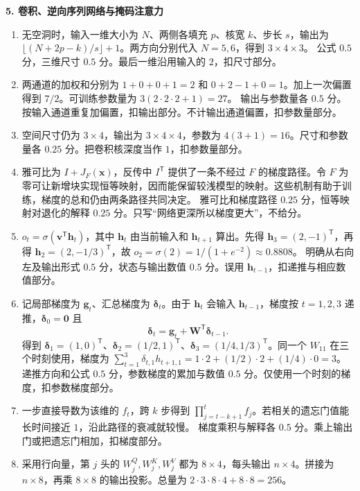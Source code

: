 \noindent\textbf{5. 卷积、逆向序列网络与掩码注意力}

\begin{enumerate}[label=(\arabic*)]
\item 无空洞时，输入一维大小为 $N$、两侧各填充 $p$、核宽 $k$、步长 $s$，输出为 $\lfloor(N+2p-k)/s\rfloor+1$。两方向分别代入 $N=5,6$，得到 $3\times4\times3$。
公式 $0.5$ 分，三维尺寸 $0.5$ 分。最后一维沿用输入的 $2$，扣尺寸部分。
\item 两通道的加权和分别为 $1+0+0+1=2$ 和 $0+2-1+0=1$。加上一次偏置得到 $7/2$。可训练参数量为 $3(2\cdot2\cdot2+1)=27$。
输出与参数量各 $0.5$ 分。按输入通道重复加偏置，扣输出部分。不计输出通道偏置，扣参数量部分。
\item 空间尺寸仍为 $3\times4$，输出为 $3\times4\times4$，参数为 $4(3+1)=16$。尺寸和参数量各 $0.25$ 分。把卷积核深度当作 $1$，扣参数量部分。
\item 雅可比为 $I+J_F(\bm{x})$，反传中 $I^{\mathsf T}$ 提供了一条不经过 $F$ 的梯度路径。令 $F$ 为零可让新增块实现恒等映射，因而能保留较浅模型的映射。这些机制有助于训练，梯度的总和仍由两条路径共同决定。
雅可比和梯度路径 $0.25$ 分，恒等映射对退化的解释 $0.25$ 分。只写“网络更深所以梯度更大”，不给分。
\item $o_t=\sigma(\bm{v}^{\mathsf T}\bm{h}_t)$，其中 $\bm{h}_t$ 由当前输入和 $\bm{h}_{t+1}$ 算出。先得 $\bm{h}_3=(2,-1)^{\mathsf T}$，再得 $\bm{h}_2=(2,-1/3)^{\mathsf T}$，故 $o_2=\sigma(2)=1/(1+e^{-2})\approx0.8808$。
明确从右向左及输出形式 $0.5$ 分，状态与输出数值 $0.5$ 分。误用 $\bm{h}_{t-1}$，扣递推与相应数值部分。
\item 记局部梯度为 $\bm{g}_t$、汇总梯度为 $\bm{\delta}_t$。由于 $\bm{h}_t$ 会输入 $\bm{h}_{t-1}$，梯度按 $t=1,2,3$ 递推，$\bm{\delta}_0=\bm{0}$ 且
\[
\bm{\delta}_t=\bm{g}_t+\bm{W}^{\mathsf T}\bm{\delta}_{t-1}.
\]
得到 $\bm{\delta}_1=(1,0)^{\mathsf T}$、$\bm{\delta}_2=(1/2,1)^{\mathsf T}$、$\bm{\delta}_3=(1/4,1/3)^{\mathsf T}$。同一个 $W_{11}$ 在三个时刻使用，梯度为 $\sum_{t=1}^3\delta_{t,1}h_{t+1,1}=1\cdot2+(1/2)\cdot2+(1/4)\cdot0=3$。
递推方向和公式 $0.5$ 分，参数梯度的累加与数值 $0.5$ 分。仅使用一个时刻的梯度，扣参数梯度部分。
\item 一步直接导数为该维的 $f_t$，跨 $k$ 步得到 $\prod_{j=t-k+1}^t f_j$。若相关的遗忘门值能长时间接近 $1$，沿此路径的衰减就较慢。
梯度乘积与解释各 $0.5$ 分。乘上输出门或把遗忘门相加，扣梯度部分。
\item 采用行向量，第 $j$ 头的 $W_j^Q,W_j^K,W_j^V$ 都为 $8\times4$，每头输出 $n\times4$。拼接为 $n\times8$，再乘 $8\times8$ 的输出投影。总量为 $2\cdot3\cdot8\cdot4+8\cdot8=256$。

\end{enumerate}

